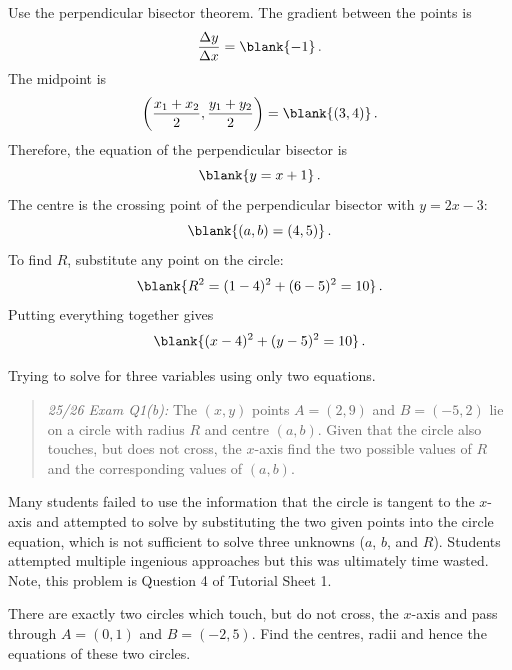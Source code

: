 \begin{solution}
Use the perpendicular bisector theorem. The gradient between the points is
\[
\frac{\Delta y}{\Delta x}=\blank{-1} \,.
\]
The midpoint is
\[
\left(\frac{x_1+x_2}{2},\frac{y_1+y_2}{2}\right)=\blank{(3,4)}\, .
\]
Therefore, the equation of the perpendicular bisector is
\[
\blank{y=x+1}\, .
\]
The centre is the crossing point of the perpendicular bisector with $y=2x-3$:
\[
\blank{(a,b)=(4,5)}\,.
\]
To find $R$, substitute any point on the circle:
\[
\blank{R^2=(1-4)^2+(6-5)^2=10}\,.
\]
Putting everything together gives
\[
\blank{(x-4)^2+(y-5)^2=10} \,.
\]
\end{solution}

\begin{exammistake}
    Trying to solve for three variables using only two equations. 
    \begin{quote}
        \textit{25/26 Exam Q1(b):}
        The $(x,y)$ points $A=(2, 9)$ and $B=(-5,2)$ lie on a circle with radius $R$ and centre $(a,b)$. Given that the circle also touches, but does not cross, the $x$-axis find the two possible values of $R$ and the corresponding values of $(a, b)$.
    \end{quote}
    Many students failed to use the information that the circle is tangent to the $x$-axis and attempted to solve by substituting the two given points into the circle equation, which is not sufficient to solve three unknowns ($a$, $b$, and $R$).
    Students attempted multiple ingenious approaches but this was ultimately time wasted.
    Note, this problem is Question 4 of Tutorial Sheet 1.
\end{exammistake} 


\begin{example}[Video]
There are exactly two circles which touch, but do not cross, the $x$-axis and pass through $A=(0,1)$ and $B=(-2,5)$. Find the centres, radii and hence the equations of these two circles.
\end{example}

